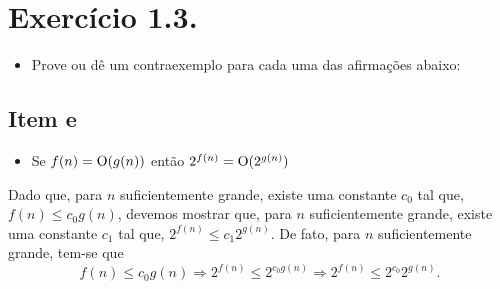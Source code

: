 \documentclass[a4paper]{article}
\newcommand{\no}{{ \rm O }}
\newenvironment{myproof}[1][\proofname]{%
  \proof[\ttfamily \large #1]%
}{\endproof}
\begin{document}
\section*{Exercício 1.3.}
\begin{itemize}
    \item  Prove ou dê um contraexemplo para cada uma das afirmações abaixo:
\end{itemize}

\subsection*{Item e}

\begin{itemize}
    \item Se $f(n)=\no(g(n))$ então $2^{f(n)}=\no(2^{g(n)})$
\end{itemize}

\begin{myproof}[prova]
    Dado que, para $n$ suficientemente grande, existe uma constante $c_0$ tal que, $f(n)\leq c_0 g(n)$, devemos mostrar que, para $n$ suficientemente grande, existe uma constante $c_1$ tal que, $2^{f(n)}\leq c_1 2^{g(n)}$. De fato, para $n$ suficientemente grande, tem-se que
    \begin{equation*}
        f(n)\leq c_0 g(n)\Rightarrow 2^{f(n)}\leq 2^{c_0 g(n)} \Rightarrow2^{f(n)}\leq 2^{c_0} 2^{g(n)}.
    \end{equation*}
\end{myproof}
\end{document}
